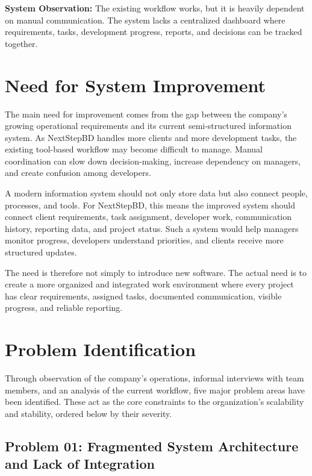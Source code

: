 \documentclass[12pt,a4paper]{report}
\begin{document}
\begin{highlightBox}
\textbf{System Observation:} The existing workflow works, but it is heavily dependent on manual communication. The system lacks a centralized dashboard where requirements, tasks, development progress, reports, and decisions can be tracked together.
\end{highlightBox}

\section{Need for System Improvement}

The main need for improvement comes from the gap between the company’s growing operational requirements and its current semi-structured information system. As NextStepBD handles more clients and more development tasks, the existing tool-based workflow may become difficult to manage. Manual coordination can slow down decision-making, increase dependency on managers, and create confusion among developers.

A modern information system should not only store data but also connect people, processes, and tools. For NextStepBD, this means the improved system should connect client requirements, task assignment, developer work, communication history, reporting data, and project status. Such a system would help managers monitor progress, developers understand priorities, and clients receive more structured updates.

The need is therefore not simply to introduce new software. The actual need is to create a more organized and integrated work environment where every project has clear requirements, assigned tasks, documented communication, visible progress, and reliable reporting.

\section{Problem Identification}

Through observation of the company’s operations, informal interviews with team members, and an analysis of the current workflow, five major problem areas have been identified. These act as the core constraints to the organization's scalability and stability, ordered below by their severity.

\subsection{Problem 01: Fragmented System Architecture and Lack of Integration}
\end{document}
